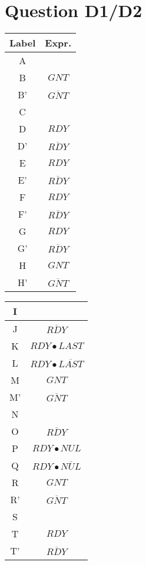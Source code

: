 \documentclass[10pt]{article}
\begin{document}
\section{Question D1/D2}
\begin{tabular}{|c|c|} \hline
  {\bf Label} & {\bf Expr.} \\ \hline
  A &  \\ \hline
  B & ${GNT}$ \\ \hline
  B' & $\overline{GNT}$ \\ \hline
  C &  \\ \hline
  D & ${RDY}$ \\ \hline
  D' & $\overline{RDY}$ \\ \hline
  E & ${RDY}$ \\ \hline
  E' & $\overline{RDY}$ \\ \hline
  F & ${RDY}$ \\ \hline
  F' & $\overline{RDY}$ \\ \hline
  G & ${RDY}$ \\ \hline
  G' & $\overline{RDY}$ \\ \hline
  H & ${GNT}$ \\ \hline
  H' & $\overline{GNT}$ \\ \hline
\end{tabular}
\quad
\begin{tabular}{|c|c|} \hline
  I &  \\ \hline
  J & $\overline{RDY}$ \\ \hline
  K & ${RDY}\bullet{LAST}$ \\ \hline
  L & ${RDY}\bullet\overline{LAST}$ \\ \hline
  M & ${GNT}$ \\ \hline
  M' & $\overline{GNT}$ \\ \hline
  N &  \\ \hline
  O & $\overline{RDY}$ \\ \hline
  P & ${RDY}\bullet{NUL}$ \\ \hline
  Q & ${RDY}\bullet\overline{NUL}$ \\ \hline
  R & ${GNT}$ \\ \hline
  R' & $\overline{GNT}$ \\ \hline
  S &  \\ \hline
  T & ${RDY}$ \\ \hline
  T' & $\overline{RDY}$ \\ \hline
\end{tabular}\\[0.5in]
\end{document}
